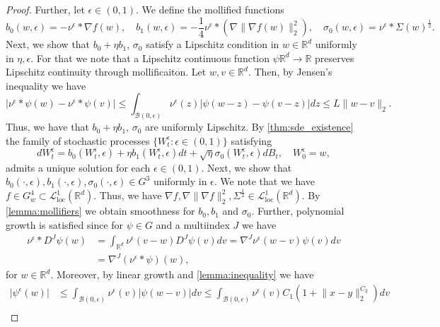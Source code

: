 \documentclass[12pt]{article}
\theoremstyle{definition}
\numberwithin{equation}{section}
\newcommand{\R}{\mathbb{R}}
\newcommand{\CL}{\mathcal{L}}
\newcommand{\CB}{\mathcal{B}}
\newcommand{\moll}{\nu^{\epsilon}}
\newcommand{\norm}[1]{\lVert{#1}\rVert_2}
\begin{document}
\begin{proof}
  Further, let $\epsilon \in (0,1)$. We define the mollified functions
  \begin{equation*}
    b_0(w, \epsilon) = - \moll * \nabla f(w), \quad b_1(w, \epsilon) = -\frac{1}{4}\moll * (\nabla\norm{\nabla f(w)}^2), \quad \sigma_0(w, \epsilon) = \moll * \Sigma(w)^{\frac{1}{2}}.
  \end{equation*}
  Next, we show that $b_0 + \eta b_1$, $\sigma_0$ satisfy a Lipschitz condition in $w \in \R^d$ uniformly in $\eta, \epsilon$.
  For that we note that a Lipschitz continuous function $\psi \R^d \rightarrow \R$ preserves Lipschitz continuity through mollificaiton. Let $w, v \in \R^d$. Then, by Jensen's inequality we have
  \begin{equation*}
    \lvert\moll*\psi(w) - \moll*\psi(v) \rvert \leq \int_{\CB(0,\epsilon)}\moll(z)\lvert\psi(w-z) - \psi(v-z)\rvert dz \leq L \norm{w-v}.
  \end{equation*}
  Thus, we have that $b_0 + \eta b_1$, $\sigma_0$ are uniformly Lipschitz. 
  By \autoref{thm:sde_existence} the family of stochastic processes $\{W_t^{\epsilon}: \epsilon \in (0,1)\}$ satisfying 
  \begin{equation*}
    dW_t^{\epsilon} = b_0(W_t^{\epsilon}, \epsilon) + \eta b_1(W_t^{\epsilon}, \epsilon)dt + \sqrt{\eta} \sigma_0(W_t^{\epsilon}, \epsilon)dB_t, \quad W_0^{\epsilon} = w,
  \end{equation*}
  admits a unique solution for each $\epsilon \in (0,1)$.
  Next, we show that $b_0(\cdot, \epsilon),b_1(\cdot, \epsilon),\sigma_0(\cdot, \epsilon) \in G^3$ uniformly in $\epsilon$.
  We note that we have $f \in G^4_w \subset \CL^1_{\text{loc}}(\R^d)$. Thus, we have $\nabla f, \nabla \norm{\nabla f}^2, \Sigma^{\frac{1}{2}} \in \CL^1_{\text{loc}}(\R^d)$. By \autoref{lemma:mollifiers} we obtain smoothness for $b_0, b_1$ and $\sigma_0$. Further, polynomial growth is satisfied since for $\psi \in G$ and a multiindex $J$ we have
  \begin{align*}
    \moll * D^J \psi (w) &= \int_{\R^d}\moll(v-w) D^J \psi (v)dv = \nabla^J\moll(w-v)\psi (v) dv \\
    &= \nabla^J(\moll * \psi)(w),
  \end{align*}
  for $w \in \R^d$.
  Moreover, by linear growth and \autoref{lemma:inequality} we have
  \begin{align*}
    \lvert \psi^{\epsilon}(w) \rvert &\leq \int_{\CB(0, \epsilon)} \moll(v) \lvert \psi(w-v) \rvert dv \leq \int_{\CB(0, \epsilon)} \moll(v) C_1 (1 + \norm{x-y}^{C_2})dv\\

\end{align*}
\end{proof}
\end{document}
